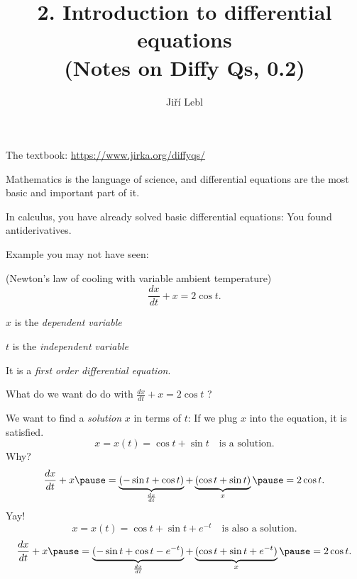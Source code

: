 \documentclass[10pt,aspectratio=169]{beamer}
\author{Ji\v{r}\'i Lebl}
\institute[OSU]{%
Oklahoma State University%
}
\title{2. Introduction to differential equations\\(Notes on Diffy Qs, 0.2)}
\date{}
\begin{document}
\begin{frame}
\titlepage


\begin{center}
The textbook: \url{https://www.jirka.org/diffyqs/}
\end{center}
\end{frame}

\begin{frame}
Mathematics is the language of science, and differential equations
are the most basic and important part of it.

\medskip
\pause

In calculus, you have already solved basic differential equations: You found
antiderivatives.

\medskip
\pause

Example you may not have seen:

{\small (Newton's law of cooling with variable ambient temperature)}
\[
\frac{dx}{dt} + x = 2 \cos t .
\]

\pause
$x$ is the \emph{dependent variable}

$t$ is the \emph{independent variable}

\medskip
\pause

It is a
\emph{first order differential equation}.

\end{frame}

\begin{frame}
What do we want do do with
\quad
$\displaystyle
\frac{dx}{dt} + x = 2 \cos t$ \quad ?

\medskip
\pause
We want to find a \emph{solution} $x$ in terms of $t$:
\quad
\pause
If we plug $x$ into the equation, it is satisfied.
\pause
\[
x = x(t) = \cos t + \sin t
\quad \text{is a solution.}
\]
\pause
Why?
\pause
\[
\frac{dx}{dt} + x
\pause
= 
\underbrace{(-\sin t + \cos t)}_{\frac{dx}{dt}}
+
\underbrace{(\cos t + \sin t)}_{x}
\pause
=
2\cos t .
\]
\pause
Yay!
\pause
\[
x = x(t) = \cos t + \sin t + e^{-t}
\quad \text{is also a solution.}
\]
\pause
\[
\frac{dx}{dt} + x
\pause
= 
\underbrace{(-\sin t + \cos t - e^{-t})}_{\frac{dx}{dt}} +
\underbrace{(\cos t + \sin t + e^{-t})}_{x}
\pause
= 2\cos t .
\]
\end{frame}
\end{document}
